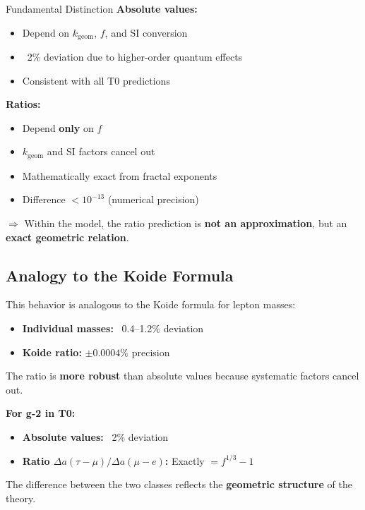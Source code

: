 	\begin{important}{Fundamental Distinction}
		\textbf{Absolute values:}
		\begin{itemize}
			\item Depend on $k_{\text{geom}}$, $f$, and SI conversion
			\item ~2\% deviation due to higher-order quantum effects
			\item Consistent with all T0 predictions
		\end{itemize}
		
		\textbf{Ratios:}
		\begin{itemize}
			\item Depend \textbf{only} on $f$
			\item $k_{\text{geom}}$ and SI factors cancel out
			\item Mathematically exact from fractal exponents
			\item Difference $< 10^{-13}$ (numerical precision)
		\end{itemize}
		
		$\Rightarrow$ Within the model, the ratio prediction is \textbf{not an approximation}, but an \textbf{exact geometric relation}.
	\end{important}
	
	\subsection{Analogy to the Koide Formula}
	
	This behavior is analogous to the Koide formula for lepton masses:
	
	\begin{itemize}
		\item \textbf{Individual masses:} ~0.4--1.2\% deviation
		\item \textbf{Koide ratio:} $\pm 0.0004\%$ precision
	\end{itemize}
	
	The ratio is \textbf{more robust} than absolute values because systematic factors cancel out.
	
	\textbf{For g-2 in T0:}
	\begin{itemize}
		\item \textbf{Absolute values:} ~2\% deviation
		\item \textbf{Ratio $\Delta a(\tau-\mu)/\Delta a(\mu-e)$:} Exactly $= f^{1/3} - 1$
	\end{itemize}
	
	The difference between the two classes reflects the \textbf{geometric structure} of the theory.
	
